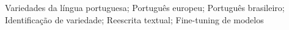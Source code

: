 \acresetall
\noindent Variedades da língua portuguesa; Português europeu; Português brasileiro; Identificação de variedade; Reescrita textual; Fine-tuning de modelos
